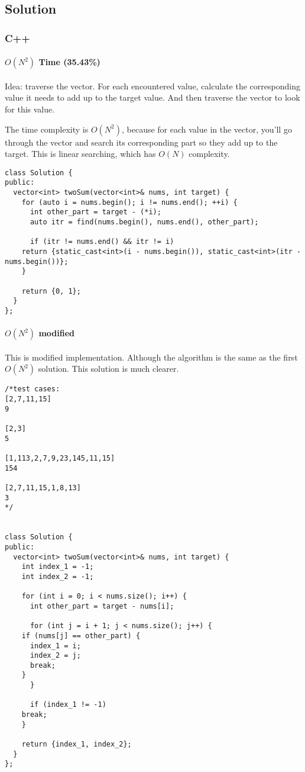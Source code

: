 \documentclass[12pt]{article}
\begin{document}
\subsection{Solution}
\label{sec:org865c879}
\subsubsection{C++}
\label{sec:org72773c5}
\paragraph{\(O(N^2)\) Time (35.43\%)}
\label{sec:orgb8f19b9}
Idea: traverse the vector. For each encountered value, calculate the corresponding value it needs to add up to the target value. And then traverse the vector to look for this value.

The time complexity is \(O(N^2)\), because for each value in the vector, you'll go through the vector and search its corresponding part so they add up to the target. This is linear searching, which has \(O(N)\) complexity.
\begin{verbatim}
class Solution {
public:
  vector<int> twoSum(vector<int>& nums, int target) {
    for (auto i = nums.begin(); i != nums.end(); ++i) {
      int other_part = target - (*i);
      auto itr = find(nums.begin(), nums.end(), other_part);

      if (itr != nums.end() && itr != i)
	return {static_cast<int>(i - nums.begin()), static_cast<int>(itr - nums.begin())};
    }

    return {0, 1};
  }
};
\end{verbatim}
\paragraph{\(O(N^2)\) modified}
\label{sec:org68324b8}
This is modified implementation. Although the algorithm is the same as the first \(O(N^2)\) solution. This solution is much clearer.
\begin{verbatim}
/*test cases: 
[2,7,11,15]
9

[2,3]
5

[1,113,2,7,9,23,145,11,15]
154

[2,7,11,15,1,8,13]
3
*/


class Solution {
public:
  vector<int> twoSum(vector<int>& nums, int target) {
    int index_1 = -1;
    int index_2 = -1;

    for (int i = 0; i < nums.size(); i++) {
      int other_part = target - nums[i];

      for (int j = i + 1; j < nums.size(); j++) {
	if (nums[j] == other_part) {
	  index_1 = i;
	  index_2 = j;
	  break;
	}
      }

      if (index_1 != -1)
	break;
    }

    return {index_1, index_2};
  }
};
\end{verbatim}
\end{document}
